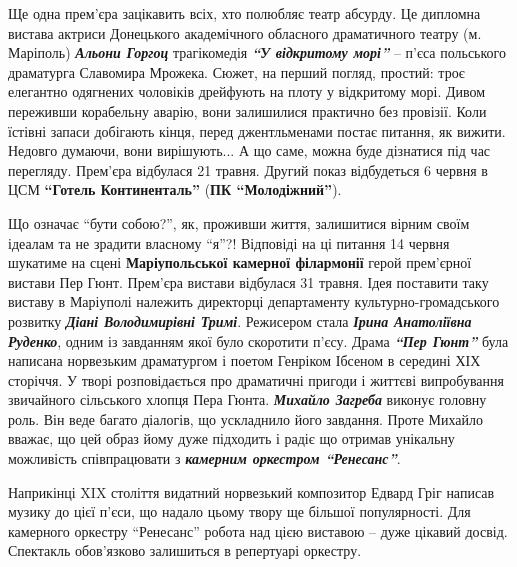 
Ще одна прем'єра зацікавить всіх, хто полюбляє театр абсурду. Це дипломна
вистава актриси Донецького академічного обласного драматичного театру
(м. Маріполь) \emph{\textbf{Альони Горгоц}} трагікомедія \emph{\textbf{\enquote{У відкритому морі}}} – п'єса польського
драматурга Славомира Мрожека. Сюжет, на перший погляд, простий: троє елегантно
одягнених чоловіків дрейфують на плоту у відкритому морі. Дивом переживши
корабельну аварію, вони залишилися практично без провізії. Коли їстівні запаси
добігають кінця, перед джентльменами постає питання, як вижити. Недовго
думаючи, вони вирішують... А що саме, можна буде дізнатися під час перегляду.
Прем'єра відбулася 21 травня. Другий показ відбудеться 6 червня в ЦСМ \textbf{\enquote{Готель
Континенталь}} (\textbf{ПК \enquote{Молодіжний}}).


Що означає \enquote{бути собою?}, як, проживши життя, залишитися вірним своїм
ідеалам та не зрадити власному \enquote{я}?! Відповіді на ці  питання 14 червня
шукатиме на сцені \textbf{Маріупольської камерної філармонії} герой прем'єрної
вистави Пер Гюнт.  Прем'єра вистави відбулася 31 травня. Ідея поставити таку
виставу в Маріуполі належить директорці департаменту культурно-громадського
розвитку  \emph{\textbf{Діані Володимирівні Тримі}}. Режисером стала
\emph{\textbf{Ірина Анатоліївна Руденко}}, одним із завданням якої було
скоротити п'єсу.  Драма \emph{\textbf{\enquote{Пер Гюнт}}} була написана
норвезьким драматургом і поетом Генріком Ібсеном в середині ХІХ сторіччя. У
творі розповідається про драматичні пригоди і життєві  випробування  звичайного
сільського хлопця Пера Гюнта. \emph{\textbf{Михайло Загреба}} виконує головну роль. Він веде
багато діалогів, що ускладнило його завдання. Проте Михайло вважає, що цей
образ йому дуже підходить і радіє що отримав унікальну можливість співпрацювати
з \emph{\textbf{камерним оркестром \enquote{Ренесанс}}}.

Наприкінці XIX століття видатний норвезький композитор Едвард Гріг написав
музику до цієї п'єси, що надало цьому твору ще більшої популярності.  Для
камерного оркестру \enquote{Ренесанс} робота над цією виставою – дуже цікавий досвід.
Спектакль обов'язково залишиться в репертуарі оркестру.



